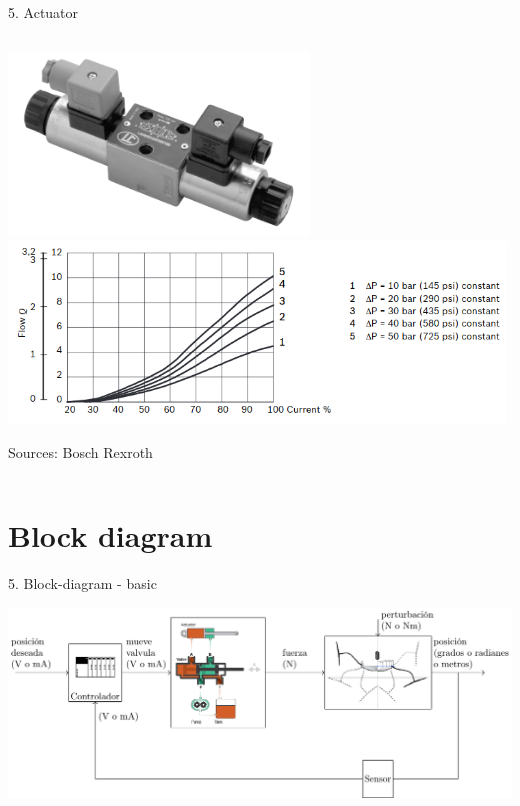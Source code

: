 \documentclass[presentation,aspectratio=169]{beamer}
\begin{document}
\begin{frame}[label={sec:org7b1b33a}]{5. Actuator}
\begin{columns}
\begin{column}{0.5\columnwidth}
\begin{center}
\includegraphics[width=0.6\textwidth]{../../figures/43-valve-real.png}\\
\includegraphics[width=0.99\textwidth]{../../figures/43-valve-current.png}\\
\end{center}
{\footnotesize Sources:  Bosch Rexroth}
\end{column}
\end{columns}
\end{frame}

\section{Block diagram}
\label{sec:orgc177935}


\begin{frame}[label={sec:org2eba7fe}]{5. Block-diagram - basic}
\begin{center}
\includegraphics[width=1.0\textwidth]{../../figures/ac75-control-block-feedback-units}
\end{center}
\end{frame}
\end{document}
